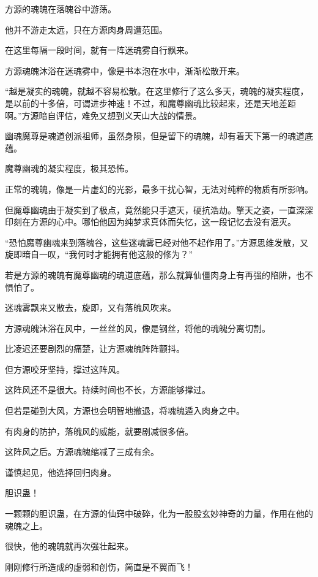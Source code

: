 
\begin{this_body}

方源的魂魄在落魄谷中游荡。

他并不游走太远，只在方源肉身周遭范围。

在这里每隔一段时间，就有一阵迷魂雾自行飘来。

方源魂魄沐浴在迷魂雾中，像是书本泡在水中，渐渐松散开来。

“越是凝实的魂魄，就越不容易松散。在这里修行了这么多天，魂魄的凝实程度，是以前的十多倍，可谓进步神速！不过，和魔尊幽魂比较起来，还是天地差距啊。”方源暗自评估，难免又想到义天山大战的情景。

幽魂魔尊是魂道创派祖师，虽然身陨，但是留下的魂魄，却有着天下第一的魂道底蕴。

魔尊幽魂的凝实程度，极其恐怖。

正常的魂魄，像是一片虚幻的光影，最多干扰心智，无法对纯粹的物质有所影响。

但魔尊幽魂由于凝实到了极点，竟然能只手遮天，硬抗浩劫。擎天之姿，一直深深印刻在方源的心中。哪怕他因为纯梦求真体而失忆，这一段记忆去没有泯灭。

“恐怕魔尊幽魂来到落魄谷，这些迷魂雾已经对他不起作用了。”方源思维发散，又旋即暗自一叹，“我何时才能拥有他这般的修为？”

若是方源的魂魄有魔尊幽魂的魂道底蕴，那么就算仙僵肉身上有再强的陷阱，也不惧怕了。

迷魂雾飘来又散去，旋即，又有落魄风吹来。

方源魂魄沐浴在风中，一丝丝的风，像是钢丝，将他的魂魄分离切割。

比凌迟还要剧烈的痛楚，让方源魂魄阵阵颤抖。

但方源咬牙坚持，撑过这阵风。

这阵风还不是很大。持续时间也不长，方源能够撑过。

但若是碰到大风，方源也会明智地撤退，将魂魄遁入肉身之中。

有肉身的防护，落魄风的威能，就要剧减很多倍。

这阵风之后。方源魂魄缩减了三成有余。

谨慎起见，他选择回归肉身。

胆识蛊！

一颗颗的胆识蛊，在方源的仙窍中破碎，化为一股股玄妙神奇的力量，作用在他的魂魄之上。

很快，他的魂魄就再次强壮起来。

刚刚修行所造成的虚弱和创伤，简直是不翼而飞！


\end{this_body}

